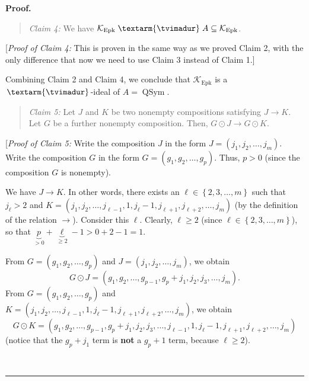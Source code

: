 \documentclass[numbers=enddot,12pt,final,onecolumn,notitlepage]{scrartcl}%
\theoremstyle{definition}
\newenvironment{statement}{\begin{quote}}{\end{quote}}
\newenvironment{proof}[1][Proof]{\noindent\textbf{#1.} }{\ \rule{0.5em}{0.5em}}
\newenvironment{verlong}{}{}
\newcommand{\tvi}{\left. \textarm{\tvimadur} \right.}
\begin{document}
\begin{verlong}
\begin{proof}
\begin{statement}
\textit{Claim 4:} We have $\mathcal{K}_{\operatorname{Epk}}\tvi  A\subseteq
\mathcal{K}_{\operatorname{Epk}}$.
\end{statement}

[\textit{Proof of Claim 4:} This is proven in the same way as we proved Claim
2, with the only difference that now we need to use Claim 3 instead of Claim 1.]

Combining Claim 2 and Claim 4, we conclude that $\mathcal{K}%
_{\operatorname{Epk}}$ is a $\tvi$-ideal of $A=\operatorname*{QSym}$.

\begin{statement}
\textit{Claim 5:} Let $J$ and $K$ be two nonempty compositions satisfying
$J\rightarrow K$. Let $G$ be a further nonempty composition. Then, $G\odot
J\rightarrow G\odot K$.
\end{statement}

[\textit{Proof of Claim 5:} Write the composition $J$ in the form $J=\left(
j_{1},j_{2},\ldots,j_{m}\right)  $. Write the composition $G$ in the form
$G=\left(  g_{1},g_{2},\ldots,g_{p}\right)  $. Thus, $p>0$ (since the
composition $G$ is nonempty).

We have $J\rightarrow K$. In other words, there exists an $\ell\in\left\{
2,3,\ldots,m\right\}  $ such that $j_{\ell}>2$ and $K=\left(  j_{1}%
,j_{2},\ldots,j_{\ell-1},1,j_{\ell}-1,j_{\ell+1},j_{\ell+2},\ldots
,j_{m}\right)  $ (by the definition of the relation $\rightarrow$). Consider
this $\ell$. Clearly, $\ell\geq2$ (since $\ell\in\left\{  2,3,\ldots
,m\right\}  $), so that $\underbrace{p}_{>0}+\underbrace{\ell}_{\geq
2}-1>0+2-1=1$.

From $G=\left(  g_{1},g_{2},\ldots,g_{p}\right)  $ and $J=\left(  j_{1}%
,j_{2},\ldots,j_{m}\right)  $, we obtain%
\begin{equation}
G\odot J=\left(  g_{1},g_{2},\ldots,g_{p-1},g_{p}+j_{1},j_{2},j_{3}%
,\ldots,j_{m}\right)  . \label{pf.thm.Epk.dend.c5.pf.GJ=}%
\end{equation}
From $G=\left(  g_{1},g_{2},\ldots,g_{p}\right)  $ and $K=\left(  j_{1}%
,j_{2},\ldots,j_{\ell-1},1,j_{\ell}-1,j_{\ell+1},j_{\ell+2},\ldots
,j_{m}\right)  $, we obtain%
\begin{equation}
G\odot K=\left(  g_{1},g_{2},\ldots,g_{p-1},g_{p}+j_{1},j_{2},j_{3}%
,\ldots,j_{\ell-1},1,j_{\ell}-1,j_{\ell+1},j_{\ell+2},\ldots,j_{m}\right)
\label{pf.thm.Epk.dend.c5.pf.GK=}%
\end{equation}
(notice that the $g_{p}+j_{1}$ term is \textbf{not} a $g_{p}+1$ term, because
$\ell\geq2$).


\end{proof}
\end{verlong}
\end{document}
